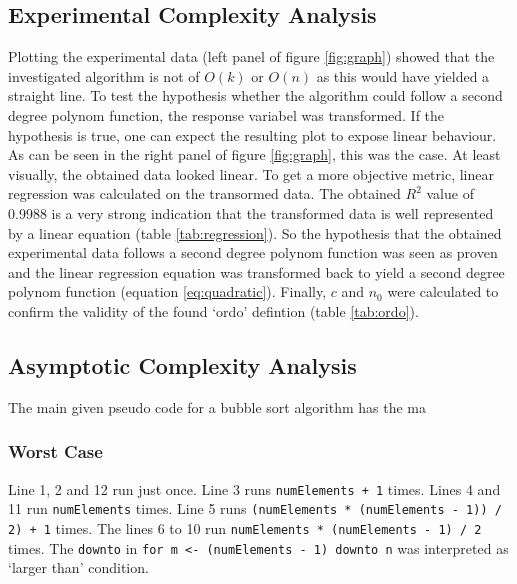 \documentclass[a4paper,11pt,twoside]{article}
\begin{document}
\subsection{Experimental Complexity Analysis}
Plotting the experimental data (left panel of figure \ref{fig:graph}) showed that
the investigated algorithm is not of $O(k)$ or $O(n)$ as this would
have yielded a straight line. To test the hypothesis whether the
algorithm could follow a second degree polynom function, the response
variabel was transformed. If the hypothesis is true, one can expect
the resulting plot to expose linear behaviour. As can be seen in the
right panel of figure \ref{fig:graph}, this was the case. At least
visually, the obtained data looked linear. To get a more objective
metric, linear regression was calculated on the transormed data. The
obtained $R^2$ value of 0.9988 is a very strong indication that the
transformed data is well represented by a linear equation 
(table \ref{tab:regression}). So the hypothesis that the obtained
experimental data follows a second degree polynom function was
seen as proven and the linear regression equation was transformed back
to yield a second degree polynom function (equation
\ref{eq:quadratic}). Finally, $c$ and $n_{0}$ were calculated to confirm
the validity of the found `ordo' defintion (table \ref{tab:ordo}). 


\subsection{Asymptotic Complexity Analysis}
The main given pseudo code for a bubble sort algorithm has the ma

\subsubsection{Worst Case}



Line 1, 2 and 12 run just once. Line 3 runs \verb!numElements + 1! times. Lines
4 and 11 run \verb!numElements! times. Line 5 runs
\verb!(numElements * (numElements - 1)) / 2) + 1! 
times. The lines 6 to 10 run \verb!numElements * (numElements - 1) / 2! times. 
The \verb!downto! in \verb!for m <- (numElements - 1) downto n! was
interpreted as `larger than' condition.



\end{document}
